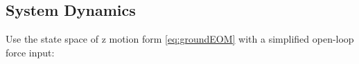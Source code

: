 %
%
%
%
%
%
\subsection{System Dynamics}
Use the state space of z motion form \ref{eq:groundEOM} with a simplified open-loop force input:

